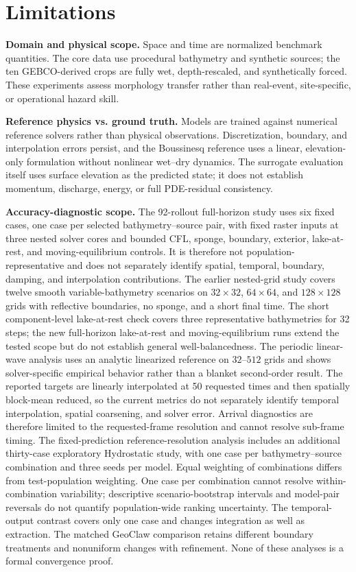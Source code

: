 \section{Limitations}
\label{sec:limitations}

\textbf{Domain and physical scope.} Space and time are normalized benchmark quantities. The core data use procedural bathymetry and synthetic sources; the ten GEBCO-derived crops are fully wet, depth-rescaled, and synthetically forced. These experiments assess morphology transfer rather than real-event, site-specific, or operational hazard skill.

\textbf{Reference physics vs. ground truth.} Models are trained against numerical reference solvers rather than physical observations. Discretization, boundary, and interpolation errors persist, and the Boussinesq reference uses a linear, elevation-only formulation without nonlinear wet--dry dynamics. The surrogate evaluation itself uses surface elevation as the predicted state; it does not establish momentum, discharge, energy, or full PDE-residual consistency.

\textbf{Accuracy-diagnostic scope.} The 92-rollout full-horizon study uses six fixed cases, one case per selected bathymetry--source pair, with fixed raster inputs at three nested solver cores and bounded CFL, sponge, boundary, exterior, lake-at-rest, and moving-equilibrium controls. It is therefore not population-representative and does not separately identify spatial, temporal, boundary, damping, and interpolation contributions. The earlier nested-grid study covers twelve smooth variable-bathymetry scenarios on $32 \times 32$, $64 \times 64$, and $128 \times 128$ grids with reflective boundaries, no sponge, and a short final time. The short component-level lake-at-rest check covers three representative bathymetries for 32 steps; the new full-horizon lake-at-rest and moving-equilibrium runs extend the tested scope but do not establish general well-balancedness. The periodic linear-wave analysis uses an analytic linearized reference on $32$--$512$ grids and shows solver-specific empirical behavior rather than a blanket second-order result. The reported targets are linearly interpolated at 50 requested times and then spatially block-mean reduced, so the current metrics do not separately identify temporal interpolation, spatial coarsening, and solver error. Arrival diagnostics are therefore limited to the requested-frame resolution and cannot resolve sub-frame timing. The fixed-prediction reference-resolution analysis includes an additional thirty-case exploratory Hydrostatic study, with one case per bathymetry--source combination and three seeds per model. Equal weighting of combinations differs from test-population weighting. One case per combination cannot resolve within-combination variability; descriptive scenario-bootstrap intervals and model-pair reversals do not quantify population-wide ranking uncertainty. The temporal-output contrast covers only one case and changes integration as well as extraction. The matched GeoClaw comparison retains different boundary treatments and nonuniform changes with refinement. None of these analyses is a formal convergence proof.

